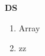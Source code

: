 
\centerline{\textbf{ \LARGE DS}}

\begin{enumerate}

    \item Array
    \item zz

\end{enumerate}
